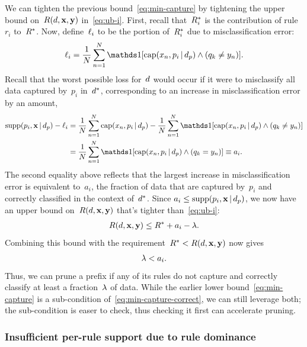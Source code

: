 We can tighten the previous bound~\eqref{eq:min-capture}
by tightening the upper bound on~$R({d}, \mathbf{x}, \mathbf{y})$ in~\eqref{eq:ub-i}.
%
First, recall that~$R^*_i$ is the contribution of rule~$r_i$ to~$R^*$.
%
Now, define~$\ell_i$ to be the portion of~$R^*_i$ due to misclassification error:
\begin{align}
\Loss_i = \frac{1}{N} \sum_{n=1}^N
  \one [ \Cap(x_n, p_i \given \Prefix) \wedge (q_k \neq y_n) ].
\end{align}
Recall that the worst possible loss for~${d}$ would occur if it were to
misclassify all data captured by~$p_i$ in~$d^*$,
corresponding to an increase in misclassification error by an amount,
\begin{align}
\Supp(p_i, \x \given \Prefix) - \Loss_i
&= \frac{1}{N} \sum_{n=1}^N \Cap(x_n, p_i \given \Prefix)
  - \frac{1}{N} \sum_{n=1}^N
  \one [ \Cap(x_n, p_i \given \Prefix) \wedge (q_k \neq y_n) ] \nn \\
&= \frac{1}{N} \sum_{n=1}^N
  \one [ \Cap(x_n, p_i \given \Prefix) \wedge (q_k = y_n) ] \equiv a_i.
\end{align}
The second equality above reflects that the largest increase in
misclassification error is equivalent to~$a_i$, the fraction of data that
are captured by~$p_i$ and correctly classified in the context of~$d^*$.
%
Since ${a_i \le \text{supp}(p_i, \mathbf{x} \,|\, d_p)}$, we now have
an upper bound on~$R({d}, \mathbf{x}, \mathbf{y})$ that's tighter than~\eqref{eq:ub-i}:
\begin{align}
\Obj(\RL, \x, \y) \le \OptimalObj + a_i - \Reg.
\end{align}
Combining this bound with the requirement~${R^* < R({d}, \mathbf{x}, \mathbf{y})}$ now gives
\begin{align}
\Reg < a_i.
\label{eq:min-capture-correct}
\end{align}
Thus, we can prune a prefix if any of its rules do not capture
and correctly classify at least a fraction~${\lambda}$ of data.
%
While the earlier lower bound~\eqref{eq:min-capture} is a sub-condition
of~\eqref{eq:min-capture-correct}, we can still leverage both;
the sub-condition is easer to check, thus checking it first can accelerate pruning.

\subsubsection{Insufficient per-rule support due to rule dominance}

